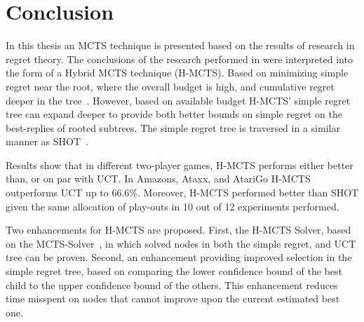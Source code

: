\documentclass{kecsmstr}
\begin{document}
\chapter{Conclusion}
\label{chap:conclusion}
In this thesis an MCTS technique is presented based on the results of research in regret theory. The conclusions of the research performed in  were interpreted into the form of a Hybrid MCTS technique (H-MCTS). Based on minimizing simple regret near the root, where the overall budget is high, and cumulative regret deeper in the tree~. However, based on available budget H-MCTS' simple regret tree can expand deeper to provide both better bounds on simple regret on the best-replies of rooted subtrees. The simple regret tree is traversed in a similar manner as SHOT~.

Results show that in different two-player games, H-MCTS performs either better than, or on par with UCT. In Amazons, Ataxx, and AtariGo H-MCTS outperforms UCT up to 66.6\%. Moreover, H-MCTS performed better than SHOT given the same allocation of play-outs in 10 out of 12 experiments performed.

Two enhancements for H-MCTS are proposed. First, the H-MCTS Solver, based on the MCTS-Solver~, in which solved nodes in both the simple regret, and UCT tree can be proven. Second, an enhancement providing improved selection in the simple regret tree, based on comparing the lower confidence bound of the best child to the upper confidence bound of the others. This enhancement reduces time misspent on nodes that cannot improve upon the current estimated best one.
\end{document}

